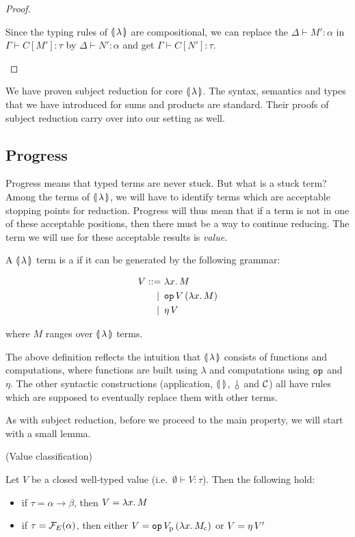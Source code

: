 \begin{proof}
\begin{itemize}
    Since the typing rules of $\llparenthesis \, \lambda \, \rrparenthesis$ are compositional, we can
    replace the $\Delta \vdash M' : \alpha$ in $\Gamma \vdash C[M'] : \tau$
    by $\Delta \vdash N' : \alpha$ and get $\Gamma \vdash C[N'] : \tau$.
  \end{itemize}
\end{proof}

We have proven subject reduction for core $\llparenthesis \, \lambda \, \rrparenthesis$. The syntax,
semantics and types that we have introduced for sums and products are
standard. Their proofs of subject reduction carry over into our setting as
well.


\subsection{Progress}
\label{ssec:progress}

Progress means that typed terms are never stuck. But what is a stuck term?
Among the terms of $\llparenthesis \, \lambda \, \rrparenthesis$, we will have to identify terms which
are acceptable stopping points for reduction. Progress will thus mean that
if a term is not in one of these acceptable positions, then there must be a
way to continue reducing. The term we will use for these acceptable results
is \emph{value}.

\begin{definition}
  A $\llparenthesis \, \lambda \, \rrparenthesis$ term is a  if it can be generated by
  the following grammar:

\begin{align*}
  V ::= &\ \lambda x.\, M \\
   | \, &\ \mathtt{op}\,V\,(\lambda x.\, M) \\
   | \, &\ \eta\,V
\end{align*}

  where $M$ ranges over $\llparenthesis \, \lambda \, \rrparenthesis$ terms.
\end{definition}

The above definition reflects the intuition that $\llparenthesis \, \lambda \, \rrparenthesis$
consists of functions and computations, where functions are built using
$\lambda$ and computations using $\mathtt{op}$ and $\eta$. The other syntactic
constructions (application, $\llparenthesis \,  \, \rrparenthesis$, $\cherry$ and $\mathcal{C}$) all have
rules which are supposed to eventually replace them with other terms.

As with subject reduction, before we proceed to the main property, we will
start with a small lemma.

\begin{lemma}\label{lem:value-classification}
  (Value classification)

  Let $V$ be a closed well-typed value (i.e.\ $\emptyset \vdash V :
  \tau$). Then the following hold:

  \begin{itemize}
  \item if $\tau = \alpha \to \beta$, then $V = \lambda x.\, M$
  \item if $\tau = \mathcal{F}_E(\alpha)$, then either
    $V = \mathtt{op}\,V_{\mathrm{p}}\,(\lambda x.\, M_{\mathrm{c}})$ or $V = \eta\,V'$
  \end{itemize}
\end{lemma}

